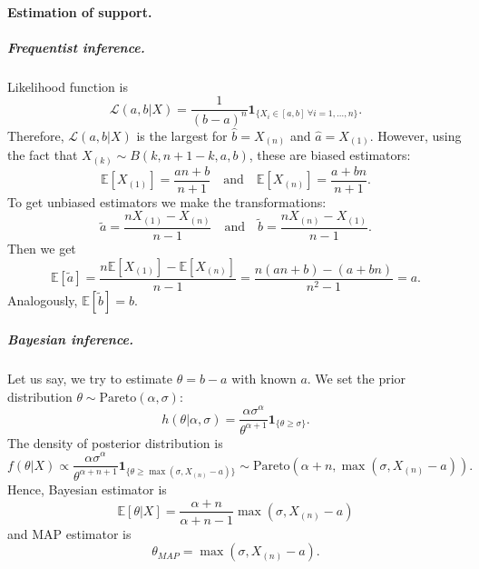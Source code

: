 \documentclass[a4paper,11pt]{article}
\theoremstyle{plain}
\theoremstyle{definition}
\newcommand{\ME}{\mathbb{E}}
\begin{document}
	\paragraph{Estimation of support.}
	\subparagraph{Frequentist inference.} Likelihood function is
	\[
	\mathcal{L}(a, b | X) = \frac{1}{(b-a)^n} \mathbf{1}_{ \{ X_i \in [a, b] \ \forall i = 1, \dots, n \} }.
	\]
	Therefore, $\mathcal{L}(a, b | X)$ is the largest for $\hat{b} = X_{(n)}$ and $\hat{a} = X_{(1)}$. However, using the fact that $X_{(k)} \sim B(k, n+1-k, a, b)$, these are biased estimators:
	\[ \ME[X_{(1)}] = \frac{an + b}{n+1} \quad \text{and} \quad \ME[X_{(n)}] = \frac{a + bn}{n+1}.  \]
	To get unbiased estimators we make the transformations:
	\[ \tilde{a} = \frac{nX_{(1)} - X_{(n)} }{n-1} \quad \text{and} \quad  \tilde{b} = \frac{nX_{(n)} - X_{(1)} }{n-1}. \]
	Then we get
	\[ 
	\ME[\tilde{a}] = \frac{n\ME[X_{(1)}] - \ME[X_{(n)}]}{n-1} = \frac{n(an+b)-(a+bn)}{n^2-1} = a.
	\]
	Analogously, $\ME[\tilde{b}] = b$.
	\subparagraph{Bayesian inference.} Let us say, we try to estimate $\theta = b-a$ with known $a$. We set the prior distribution $\theta \sim \mathrm{Pareto}(\alpha, \sigma)$:
	\[
	h(\theta|\alpha, \sigma) = \frac{\alpha \sigma^\alpha}{\theta^{\alpha + 1}} \mathbf{1}_{\{\theta \geq \sigma\}}.
	\]
	The density of posterior distribution is
	\[
	f(\theta|X) \propto \frac{\alpha \sigma^\alpha}{\theta^{\alpha+n+1}} \mathbf{1}_{\{\theta \geq \max(\sigma, X_{(n)}-a) \}} \sim \mathrm{Pareto}(\alpha + n, \max(\sigma, X_{(n)}-a) ).
	\]
	Hence, Bayesian estimator is
	\[  
	\ME[\theta|X] = \frac{\alpha + n}{\alpha + n - 1}\max(\sigma, X_{(n)}-a)
	\]
	and MAP estimator is
	\[
	\theta_{MAP} = \max(\sigma, X_{(n)}-a).
	\]
	
\end{document}
